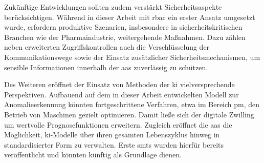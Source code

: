 Zukünftige Entwicklungen sollten zudem verstärkt Sicherheitsaspekte berücksichtigen. 
Während in dieser Arbeit mit \acs{rbac} ein erster Ansatz umgesetzt wurde, erfordern produktive Szenarien, insbesondere in sicherheitskritischen Branchen wie der Pharmaindustrie, weitergehende Maßnahmen. 
Dazu zählen neben erweiterten Zugriffskontrollen auch die Verschlüsselung der Kommunikationswege sowie der Einsatz zusätzlicher Sicherheitsmechanismen, um sensible Informationen innerhalb der \acs{aas} zuverlässig zu schützen.

Des Weiteren eröffnet der Einsatz von Methoden der \acs{ki} vielversprechende Perspektiven.
Aufbauend auf dem in dieser Arbeit entwickelten Modell zur Anomalieerkennung könnten fortgeschrittene Verfahren, etwa im Bereich \acs{pm}, den Betrieb von Maschinen gezielt optimieren. 
Damit ließe sich der digitale Zwilling um wertvolle Prognosefunktionen erweitern. 
Zugleich eröffnet die \acs{aas} die Möglichkeit, \acs{ki}-Modelle über ihren gesamten Lebenszyklus hinweg in standardisierter Form zu verwalten. 
Erste \acsp{smt} wurden hierfür bereits veröffentlicht und könnten künftig als Grundlage dienen.

